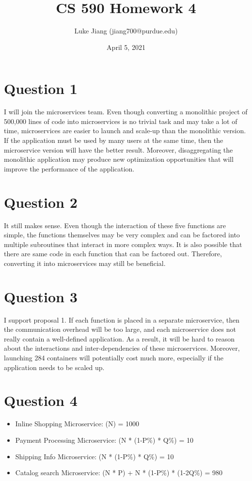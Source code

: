 \documentclass{article}
\title{CS 590 Homework 4}
\author{Luke Jiang (jiang700@purdue.edu) }
\date{April 5, 2021}
\begin{document}
\maketitle

\section{Question 1}
I will join the microservices team. Even though converting a monolithic project of 500,000 lines of code into microservices is no trivial task and may take a lot of time, microservices are easier to launch and scale-up than the monolithic version. If the application must be used by many users at the same time, then the microservice version will have the better result. Moreover, disaggregating the monolithic application may produce new optimization opportunities that will improve the performance of the application.

\section{Question 2}
It still makes sense. Even though the interaction of these five functions are simple, the functions themselves may be very complex and can be factored into multiple subroutines that interact in more complex ways. It is also possible that there are same code in each function that can be factored out. Therefore, converting it into microservices may still be beneficial.

\section{Question 3}
I support proposal 1. If each function is placed in a separate microservice, then the communication overhead will be too large, and each microservice does not really contain a well-defined application. As a result, it will be hard to reason about the interactions and inter-dependencies of these microservices. Moreover, launching 284 containers will potentially cost much more, especially if the application needs to be scaled up. 

\section{Question 4}
\begin{itemize}
    \item Inline Shopping Microservice: (N) = 1000
    \item Payment Processing Microservice: (N * (1-P\%) * Q\%) = 10
    \item Shipping Info Microservice: (N * (1-P\%) * Q\%) = 10
    \item Catalog search Microservice: (N * P) + N * (1-P\%) * (1-2Q\%) = 980
\end{itemize}
\end{document}
